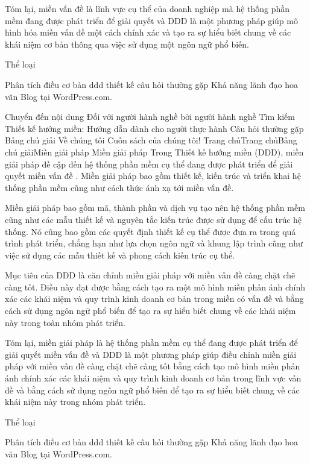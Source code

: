 Tóm lại, miền vấn đề là lĩnh vực cụ thể của doanh nghiệp mà hệ thống phần mềm đang được phát triển để giải quyết và DDD là một phương pháp giúp mô hình hóa miền vấn đề một cách chính xác và tạo ra sự hiểu biết chung về các khái niệm cơ bản thông qua việc sử dụng một ngôn ngữ phổ biến.


Thể loại

Phân tích
điều cơ bản
ddd
thiết kế
câu hỏi thường gặp
Khả năng lãnh đạo
hoa văn
Blog tại WordPress.com.

Chuyển đến nội dung
Đối với người hành nghề bởi người hành nghề
Tìm kiếm
Thiết kế hướng miền: Hướng dẫn dành cho người thực hành
Câu hỏi thường gặp
Bảng chú giải
Về chúng tôi
Cuốn sách của chúng tôi!
Trang chủTrang chủBảng chú giảiMiền giải pháp
Miền giải pháp
Trong Thiết kế hướng miền (DDD), miền giải pháp đề cập đến hệ thống phần mềm cụ thể đang được phát triển để giải quyết miền vấn đề . Miền giải pháp bao gồm thiết kế, kiến ​​trúc và triển khai hệ thống phần mềm cũng như cách thức ánh xạ tới miền vấn đề.

Miền giải pháp bao gồm mã, thành phần và dịch vụ tạo nên hệ thống phần mềm cũng như các mẫu thiết kế và nguyên tắc kiến ​​trúc được sử dụng để cấu trúc hệ thống. Nó cũng bao gồm các quyết định thiết kế cụ thể được đưa ra trong quá trình phát triển, chẳng hạn như lựa chọn ngôn ngữ và khung lập trình cũng như việc sử dụng các mẫu thiết kế và phong cách kiến ​​trúc cụ thể.

Mục tiêu của DDD là căn chỉnh miền giải pháp với miền vấn đề càng chặt chẽ càng tốt. Điều này đạt được bằng cách tạo ra một mô hình miền phản ánh chính xác các khái niệm và quy trình kinh doanh cơ bản trong miền có vấn đề và bằng cách sử dụng ngôn ngữ phổ biến để tạo ra sự hiểu biết chung về các khái niệm này trong toàn nhóm phát triển.

Tóm lại, miền giải pháp là hệ thống phần mềm cụ thể đang được phát triển để giải quyết miền vấn đề và DDD là một phương pháp giúp điều chỉnh miền giải pháp với miền vấn đề càng chặt chẽ càng tốt bằng cách tạo mô hình miền phản ánh chính xác các khái niệm và quy trình kinh doanh cơ bản trong lĩnh vực vấn đề và bằng cách sử dụng ngôn ngữ phổ biến để tạo ra sự hiểu biết chung về các khái niệm này trong nhóm phát triển.


Thể loại

Phân tích
điều cơ bản
ddd
thiết kế
câu hỏi thường gặp
Khả năng lãnh đạo
hoa văn
Blog tại WordPress.com.